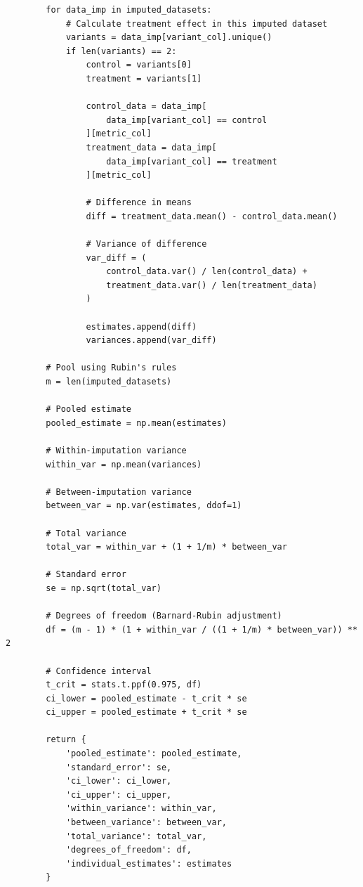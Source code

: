 \begin{lstlisting}
        for data_imp in imputed_datasets:
            # Calculate treatment effect in this imputed dataset
            variants = data_imp[variant_col].unique()
            if len(variants) == 2:
                control = variants[0]
                treatment = variants[1]

                control_data = data_imp[
                    data_imp[variant_col] == control
                ][metric_col]
                treatment_data = data_imp[
                    data_imp[variant_col] == treatment
                ][metric_col]

                # Difference in means
                diff = treatment_data.mean() - control_data.mean()

                # Variance of difference
                var_diff = (
                    control_data.var() / len(control_data) +
                    treatment_data.var() / len(treatment_data)
                )

                estimates.append(diff)
                variances.append(var_diff)

        # Pool using Rubin's rules
        m = len(imputed_datasets)

        # Pooled estimate
        pooled_estimate = np.mean(estimates)

        # Within-imputation variance
        within_var = np.mean(variances)

        # Between-imputation variance
        between_var = np.var(estimates, ddof=1)

        # Total variance
        total_var = within_var + (1 + 1/m) * between_var

        # Standard error
        se = np.sqrt(total_var)

        # Degrees of freedom (Barnard-Rubin adjustment)
        df = (m - 1) * (1 + within_var / ((1 + 1/m) * between_var)) ** 2

        # Confidence interval
        t_crit = stats.t.ppf(0.975, df)
        ci_lower = pooled_estimate - t_crit * se
        ci_upper = pooled_estimate + t_crit * se

        return {
            'pooled_estimate': pooled_estimate,
            'standard_error': se,
            'ci_lower': ci_lower,
            'ci_upper': ci_upper,
            'within_variance': within_var,
            'between_variance': between_var,
            'total_variance': total_var,
            'degrees_of_freedom': df,
            'individual_estimates': estimates
        }
\end{lstlisting}


